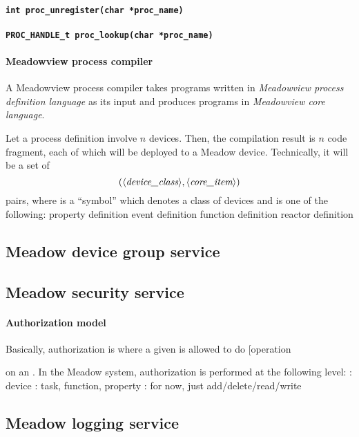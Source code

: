 \documentclass{note}
\begin{document}
{\paragraph{\small\textcolor{red2}{\tt{}int proc\_unregister(char *proc\_name)}}
\paragraph{\small\textcolor{red2}{\tt{}PROC\_HANDLE\_t proc\_lookup(char *proc\_name)}}

\paragraph{Meadowview process compiler}
A Meadowview process compiler takes programs written in \textcolor{red2}{\em
  Meadowview process definition language\/} as its input and produces  
programs in {\em Meadowview core language}. 

Let a process definition involve $n$ devices. 
Then, the compilation result is $n$ code fragment, each of which will be
deployed to a Meadow device. Technically, it will be a set of 
   \[ (\textrm{\mbox{$\langle{\textit{device\_class}}\rangle$}}, \textrm{\mbox{$\langle{\textit{core\_item}}\rangle$}})\]
pairs, where  is a ``symbol'' which denotes a class of
devices and  is one of the following:
\bit
\w property definition
\w event definition
\w function definition
\w reactor definition
\eit

\subsection{Meadow device group service}

\subsection{Meadow security service}
\paragraph{Authorization model}
Basically, authorization is where a given  is allowed to do
\bb[operation} on an .
In the Meadow system, authorization is performed at the following level:
\bit
\w {}: device
\w {}: task, function, property
\w {}: for now, just add/delete/read/write
\eit


\subsection{Meadow logging service}
\end{document}
